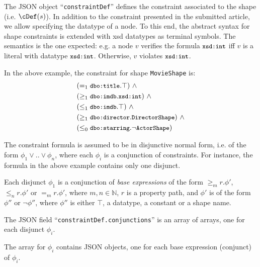 \documentclass[]{article}
\newcommand{\exFont}[1]{\texttt{{\small #1}}}
\begin{document}
The JSON object ``\exFont{constraintDef}'' defines the constraint associated to the shape (i.e. $\cDef(s)$).
In addition to the constraint presented in the submitted article, we allow specifying the datatype of a node.
To this end,
the abstract syntax for shape constraints is extended with xsd datatypes as terminal symbols.
The semantics is the one expected:
e.g. a node $v$ verifies the formula $\exFont{xsd:int}$ iff $v$ is a literal with datatype $\exFont{xsd:int}$.
Otherwise, $v$ violates $\exFont{xsd:int}$.

In the above example,
the constraint for shape \exFont{MovieShape} is:
\begin{align*}
   & (=_1 \exFont{dbo:title}.\top)\ \wedge\\
   & (\geq_1 \exFont{dbo:imdb}.\exFont{xsd:int})\ \wedge\\
   & (\leq_1 \exFont{dbo:imdb}.\top)\ \wedge\\
   & (\geq_1 \exFont{dbo:director}.\exFont{DirectorShape})\ \wedge\\
   & (\leq_0 \exFont{dbo:starring}.\neg \exFont{ActorShape})
\end{align*}

  
The constraint formula is assumed to be in disjunctive normal form,
i.e. of the form $\phi_1 \vee .. \vee \phi_n$,
where each $\phi_i$ is a conjunction of constraints.
For instance,
the formula in the above example contains only one disjunct.

Each disjunct $\phi_1$ is a conjunction of \emph{base expressions} of the form $\geq_m r.\phi'$, $\leq_n r.\phi'$ or $=_m r.\phi'$,
where $m, n \in \mathbb{N}$,
$r$ is a \sparql property path, 
and $\phi'$ is of the form $\phi''$ or $\neg \phi''$,
where $\phi''$ is either $\top$, a datatype, a constant or a shape name.

The JSON field ``\exFont{constraintDef.conjunctions}'' is an array of arrays,
one for each disjunct $\phi_i$.

The array for $\phi_i$ contains JSON objects,
one for each base expression (conjunct) of $\phi_i$.  
\end{document}
